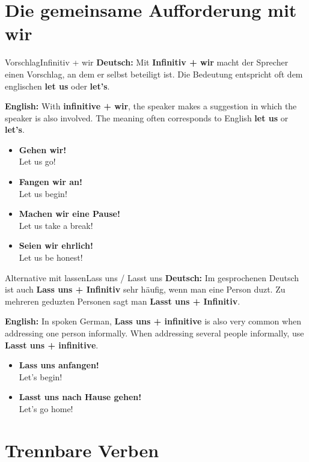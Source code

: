 \documentclass[a4paper,11pt]{article}
\newcommand{\GermanText}[1]{\textbf{Deutsch: }#1\par}
\newcommand{\EnglishText}[1]{{\small\color{SoftGray}\textbf{English: }#1\par}}
\newcommand{\ExampleItem}[2]{\item \textbf{#1}\\{\small\color{SoftGray}#2}}
\begin{document}
    \section{Die gemeinsame Aufforderung mit wir}

        \begin{grammarentry}{Vorschlag}{Infinitiv + wir}
            \GermanText{Mit \textbf{Infinitiv + wir} macht der Sprecher einen Vorschlag, an dem er selbst beteiligt ist. Die Bedeutung entspricht oft dem englischen \textbf{let us} oder \textbf{let's}.}
            \EnglishText{With \textbf{infinitive + wir}, the speaker makes a suggestion in which the speaker is also involved. The meaning often corresponds to English \textbf{let us} or \textbf{let's}.}
        \end{grammarentry}

        \begin{exbox}
            \begin{itemize}
                \ExampleItem{Gehen wir!}{Let us go!}
                \ExampleItem{Fangen wir an!}{Let us begin!}
                \ExampleItem{Machen wir eine Pause!}{Let us take a break!}
                \ExampleItem{Seien wir ehrlich!}{Let us be honest!}
            \end{itemize}
        \end{exbox}

        \begin{grammarentry}{Alternative mit lassen}{Lass uns / Lasst uns}
            \GermanText{Im gesprochenen Deutsch ist auch \textbf{Lass uns + Infinitiv} sehr häufig, wenn man eine Person duzt. Zu mehreren geduzten Personen sagt man \textbf{Lasst uns + Infinitiv}.}
            \EnglishText{In spoken German, \textbf{Lass uns + infinitive} is also very common when addressing one person informally. When addressing several people informally, use \textbf{Lasst uns + infinitive}.}
        \end{grammarentry}

        \begin{exbox}
            \begin{itemize}
                \ExampleItem{Lass uns anfangen!}{Let's begin!}
                \ExampleItem{Lasst uns nach Hause gehen!}{Let's go home!}
            \end{itemize}
        \end{exbox}

    \section{Trennbare Verben}
\end{document}
